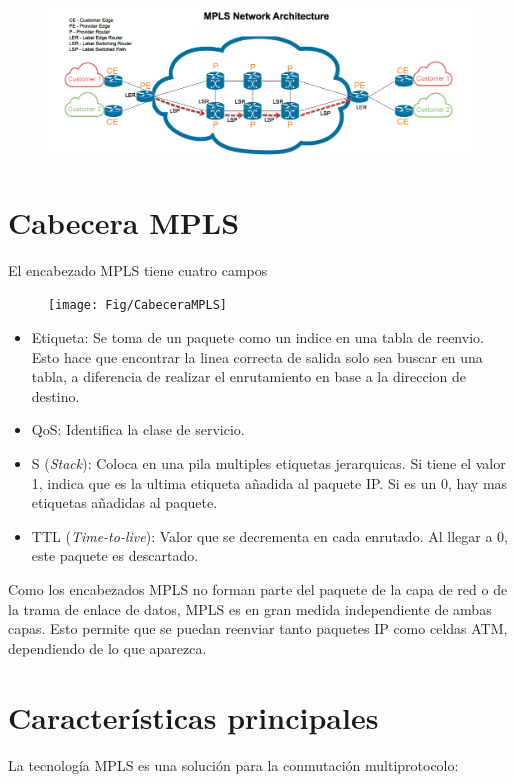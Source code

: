 \documentclass[a4paper]{article}
\begin{document}
\begin{figure}[H]
    \centering
    \includegraphics[scale=0.3]{Fig/RedMPLS}
    \caption{}
    \label{}
\end{figure}

\section{Cabecera MPLS}
El encabezado MPLS tiene cuatro campos
\begin{figure}[H]
    \centering
    \texttt{[image: Fig/CabeceraMPLS]}
    \caption{}
    \label{}
\end{figure}

\begin{itemize}
    \item Etiqueta: Se toma de un paquete como un indice en una tabla de reenvio. Esto hace que encontrar la linea correcta de salida solo sea buscar en una tabla, a diferencia de realizar el enrutamiento en base a la direccion de destino.
    
    \item QoS: Identifica la clase de servicio.
    
    \item S (\textit{Stack}): Coloca en una pila multiples etiquetas jerarquicas. Si tiene el valor 1, indica que es la ultima etiqueta añadida al paquete IP. Si es un 0, hay mas etiquetas añadidas al paquete.
    
    \item TTL (\textit{Time-to-live}): Valor que se decrementa en cada enrutado. Al llegar a 0, este paquete es descartado.
\end{itemize}

Como los encabezados MPLS no forman parte del paquete de la capa de red o de la trama de enlace de datos, MPLS es en gran medida independiente de ambas capas. Esto permite que se puedan reenviar tanto paquetes IP como celdas ATM, dependiendo de lo que aparezca.

\section{Características principales}
La tecnología MPLS es una solución para la conmutación multiprotocolo:
\end{document}

